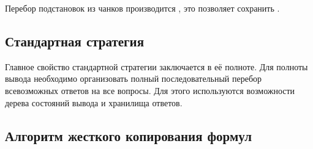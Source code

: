 Перебор подстановок из чанков производится , это позволяет сохранить .

\subsection{Стандартная стратегия }
Главное свойство стандартной стратегии  заключается в её полноте. Для полноты вывода необходимо организовать полный последовательный перебор всевозможных ответов на все вопросы. Для этого используются возможности дерева состояний вывода и хранилища ответов. 

\subsection{Алгоритм жесткого копирования формул}


